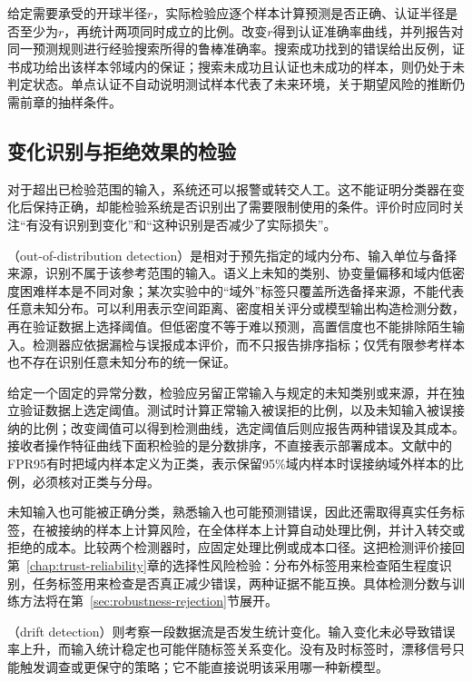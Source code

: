 给定需要承受的开球半径$r$，实际检验应逐个样本计算预测是否正确、认证半径是否至少为$r$，再统计两项同时成立的比例。改变$r$得到认证准确率曲线，并列报告对同一预测规则进行经验搜索所得的鲁棒准确率。搜索成功找到的错误给出反例，证书成功给出该样本邻域内的保证；搜索未成功且认证也未成功的样本，则仍处于未判定状态。单点认证不自动说明测试样本代表了未来环境，关于期望风险的推断仍需前章的抽样条件。

\subsection{变化识别与拒绝效果的检验}
\label{sec:robustness-monitor-test}

对于超出已检验范围的输入，系统还可以报警或转交人工。这不能证明分类器在变化后保持正确，却能检验系统是否识别出了需要限制使用的条件。评价时应同时关注“有没有识别到变化”和“这种识别是否减少了实际损失”。

（out-of-distribution detection）是相对于预先指定的域内分布、输入单位与备择来源，识别不属于该参考范围的输入。语义上未知的类别、协变量偏移和域内低密度困难样本是不同对象；某次实验中的“域外”标签只覆盖所选备择来源，不能代表任意未知分布。可以利用表示空间距离、密度相关评分或模型输出构造检测分数，再在验证数据上选择阈值。但低密度不等于难以预测，高置信度也不能排除陌生输入。检测器应依据漏检与误报成本评价，而不只报告排序指标；仅凭有限参考样本也不存在识别任意未知分布的统一保证。

给定一个固定的异常分数，检验应另留正常输入与规定的未知类别或来源，并在独立验证数据上选定阈值。测试时计算正常输入被误拒的比例，以及未知输入被误接纳的比例；改变阈值可以得到检测曲线，选定阈值后则应报告两种错误及其成本。接收者操作特征曲线下面积检验的是分数排序，不直接表示部署成本。文献中的FPR95有时把域内样本定义为正类，表示保留95\%域内样本时误接纳域外样本的比例，必须核对正类与分母。

未知输入也可能被正确分类，熟悉输入也可能预测错误，因此还需取得真实任务标签，在被接纳的样本上计算风险，在全体样本上计算自动处理比例，并计入转交或拒绝的成本。比较两个检测器时，应固定处理比例或成本口径。这把检测评价接回第~\ref{chap:trust-reliability}章的选择性风险检验：分布外标签用来检查陌生程度识别，任务标签用来检查是否真正减少错误，两种证据不能互换。具体检测分数与训练方法将在第~\ref{sec:robustness-rejection}节展开。

（drift detection）则考察一段数据流是否发生统计变化。输入变化未必导致错误率上升，而输入统计稳定也可能伴随标签关系变化。没有及时标签时，漂移信号只能触发调查或更保守的策略；它不能直接说明该采用哪一种新模型。

